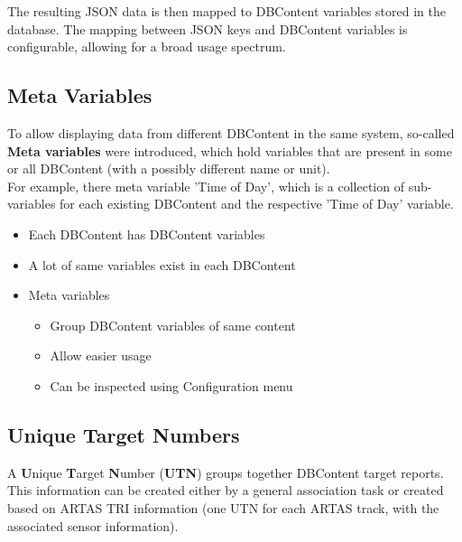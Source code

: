 The resulting JSON data is then mapped to DBContent variables stored in the database. The mapping between JSON keys and DBContent variables is configurable, allowing for a broad usage spectrum.


\subsection*{Meta Variables}

To allow displaying data from different DBContent in the same system, so-called \textbf{Meta variables} were introduced, which hold variables that are present in some or all DBContent (with a possibly different name or unit). \\
For example, there meta variable 'Time of Day', which is a collection of sub-variables for each existing DBContent and the respective 'Time of Day' variable. \\

\begin{itemize}
\item Each DBContent has DBContent variables
\item A lot of same variables exist in each DBContent
\item Meta variables
\begin{itemize}
\item Group DBContent variables of same content
\item Allow easier usage
\item Can be inspected using Configuration menu
\end{itemize}
\end{itemize}

\subsection*{Unique Target Numbers}
A \textbf{U}nique \textbf{T}arget \textbf{N}umber (\textbf{UTN}) groups together DBContent target reports.
This information can be created either by a general association task or created based on ARTAS TRI information (one UTN for each ARTAS track, with the associated sensor information). \\

